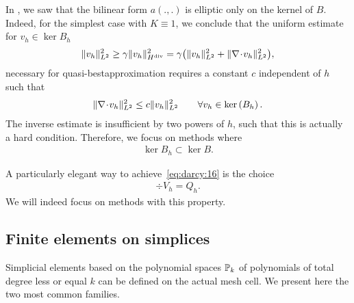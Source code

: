 \begin{intro}
  In , we saw that the
  bilinear form $a(.,.)$ is elliptic only on the kernel of
  $B$. Indeed, for the simplest case with $K\equiv 1$, we conclude
  that the uniform estimate for $v_h\in \ker{B_h}$
  \begin{gather*}
    \norm{v_h}^2_{L^2}
    \ge \ellipa \norm{v_h}^2_{\Hdiv}
    = \ellipa \bigl(\norm{v_h}^2_{L^2} + \norm{\div v_h}^2_{L^2}\bigr),
  \end{gather*}
  necessary for quasi-bestapproximation requires a constant $c$
  independent of $h$ such that
  \begin{gather*}
    \norm{\div v_h}^2_{L^2} \le c \norm{v_h}^2_{L^2}
    \qquad\forall v_h\in\ker{B_h}.
  \end{gather*}
  The inverse estimate is insufficient by two powers of $h$, such that
  this is actually a hard condition. Therefore, we focus on
  methods where
  \begin{gather}
    \label{eq:darcy:16}
    \ker{B_h} \subset \ker B.
  \end{gather}
\end{intro}

\begin{remark}
  A particularly elegant way to achieve~\eqref{eq:darcy:16} is the
  choice
  \begin{gather}
    \label{eq:darcy:17}
    \div V_h = Q_h.
  \end{gather}
  We will indeed focus on methods with this property.
\end{remark}

\subsection{Finite elements on simplices}

\begin{intro}
  Simplicial elements based on the polynomial spaces $\P_k$ of
  polynomials of total degree less or equal $k$ can be defined on the
  actual mesh cell. We present here the two most common families.
\end{intro}


